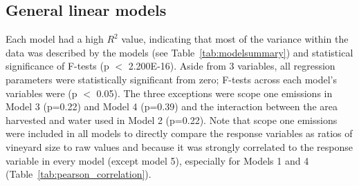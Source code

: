 \documentclass[10pt,letterpaper]{article}
\begin{document}
\subsection*{General linear models}

Each model had a high $R^2$ value, indicating that most of the variance within the data was described by the models (see Table~\ref{tab:modelsummary}) and statistical significance of F-tests (p $<$ 2.200E-16). Aside from 3 variables, all regression parameters were statistically significant from zero; F-tests across each model's variables were (p $<$ 0.05). The three exceptions were scope one emissions in Model 3 (p=0.22) and Model 4 (p=0.39) and the interaction between the area harvested and water used in Model 2 (p=0.22). Note that scope one emissions were included in all models to directly compare the response variables as ratios of vineyard size to raw values and because it was strongly correlated to the response variable in every model (except model 5), especially for Models 1 and 4 (Table~\ref{tab:pearson_correlation}). 
\par
\end{document}
